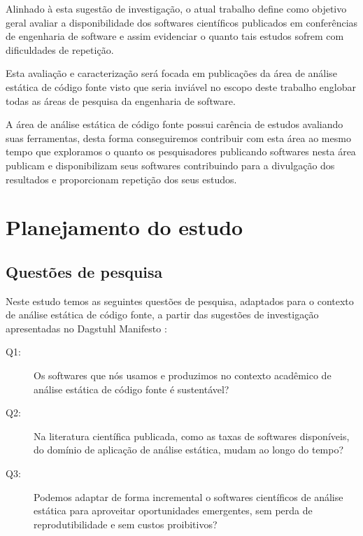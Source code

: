 Alinhado à esta sugestão de investigação, o atual trabalho define como objetivo
geral avaliar a disponibilidade dos softwares científicos publicados em
conferências de engenharia de software e assim evidenciar o quanto tais estudos
sofrem com dificuldades de repetição.

Esta avaliação e caracterização será focada em publicações da área de análise
estática de código fonte visto que seria inviável no escopo deste trabalho
englobar todas as áreas de pesquisa da engenharia de software.

A área de análise estática de código fonte possui carência de estudos avaliando
suas ferramentas, desta forma conseguiremos contribuir com esta área ao mesmo
tempo que exploramos o quanto os pesquisadores publicando softwares nesta área
publicam e disponibilizam seus softwares contribuindo para a divulgação dos
resultados e proporcionam repetição dos seus estudos.

\section{Planejamento do estudo}

\subsection{Questões de pesquisa}

Neste estudo temos as seguintes questões de pesquisa, adaptados para o contexto
de análise estática de código fonte, a partir das sugestões de investigação
apresentadas no Dagstuhl Manifesto \cite{allen2017engineering}:

\newcommand{\QuestaoUm}{Os softwares que nós usamos e produzimos no contexto
acadêmico de análise estática de código fonte é sustentável?}

\newcommand{\QuestaoDois}{Na literatura científica publicada, como as taxas de
softwares disponíveis, do domínio de aplicação de análise estática, mudam ao
longo do tempo?}

\newcommand{\QuestaoTres}{Podemos adaptar de forma incremental o softwares
científicos de análise estática para aproveitar oportunidades emergentes, sem
perda de reprodutibilidade e sem custos proibitivos?}

\begin{description}
  \item [Q1:] \QuestaoUm
  \item [Q2:] \QuestaoDois
  \item [Q3:] \QuestaoTres
\end{description}

